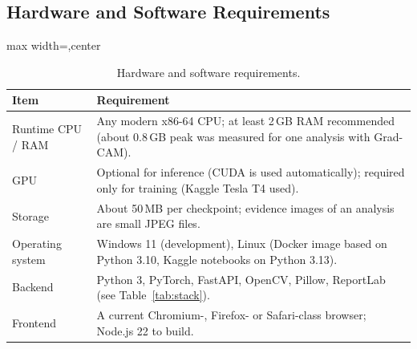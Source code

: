 \subsection{Hardware and Software Requirements}
\begin{table}[ht]
\centering
\caption{Hardware and software requirements.}
\label{tab:hwsw}
\small
\begin{adjustbox}{max width=\linewidth,center}
\begin{tabular}{|p{3.0cm}|p{8.8cm}|}
\hline
\textbf{Item} & \textbf{Requirement} \\ \hline
Runtime CPU / RAM & Any modern x86-64 CPU; at least 2\,GB RAM recommended (about 0.8\,GB peak was measured for one analysis with Grad-CAM). \\ \hline
GPU & Optional for inference (CUDA is used automatically); required only for training (Kaggle Tesla T4 used). \\ \hline
Storage & About 50\,MB per checkpoint; evidence images of an analysis are small JPEG files. \\ \hline
Operating system & Windows 11 (development), Linux (Docker image based on Python 3.10, Kaggle notebooks on Python 3.13). \\ \hline
Backend & Python 3, PyTorch, FastAPI, OpenCV, Pillow, ReportLab (see Table~\ref{tab:stack}). \\ \hline
Frontend & A current Chromium-, Firefox- or Safari-class browser; Node.js 22 to build. \\ \hline
\end{tabular}
\end{adjustbox}
\end{table}

